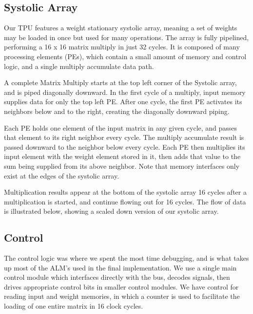 \documentclass[11pt, conference, onecolumn]{IEEEtran}
\begin{document}
    \subsection{Systolic Array}
        Our TPU features a weight stationary systolic array, meaning a set of weights may
        be loaded in once but used for many operations. The array is fully pipelined,
        performing a 16 x 16 matrix multiply in just 32 cycles. It is composed of many
        processing elements (PEs), which contain a small amount of memory and control
        logic, and a single multiply accumulate data path.

        A complete Matrix Multiply starts at the top left corner of the Systolic array,
        and is piped diagonally downward. In the first cycle of a multiply, input memory
        supplies data for only the top left PE. After one cycle, the first PE
        activates its neighbors below and to the right, creating the diagonally downward
        piping.

        Each PE holds one element of the input matrix in any given cycle, and passes that
        element to its right neighbor every cycle. The multiply accumulate result is
        passed downward to the neighbor below every cycle. Each PE then multiplies its
        input element with the weight element stored in it, then adds that value to the
        sum being supplied from its above neighbor. Note that memory interfaces only exist
        at the edges of the systolic array.

        Multiplication results appear at the bottom of the systolic array 16 cycles after
        a multiplication is started, and continue flowing out for 16 cycles. The flow of
        data is illustrated below, showing a scaled down version of our systolic array.

    \subsection{Control}
        The control logic was where we spent the most time debugging, and is what takes
        up most of the ALM's used in the final implementation. We use a single main
        control module which interfaces directly with the bus, decodes signals, then
        drives appropriate control bits in smaller control modules. We have control for
        reading input and weight memories, in which a counter is used to facilitate the
        loading of one entire matrix in 16 clock cycles.
\end{document}
